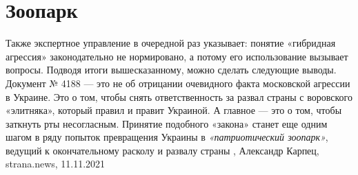  
 
 
 
 
\chapter{Зоопарк}
\label{sec:slova.zoopark}

Также экспертное управление в очередной раз указывает: понятие «гибридная
агрессия» законодательно не нормировано, а потому его использование вызывает
вопросы.  Подводя итоги вышесказанному, можно сделать следующие выводы.
Документ № 4188 — это не об отрицании очевидного факта московской агрессии в
Украине. Это о том, чтобы снять ответственность за развал страны с воровского
«элитняка», который правил и правит Украиной. А главное — это о том, чтобы
заткнуть рты несогласным. Принятие подобного «закона» станет еще одним шагом в
ряду попыток превращения Украины в \emph{«патриотический зоопарк»}, ведущий к
окончательному расколу и развалу страны
, 
Александр Карпец, strana.news, 11.11.2021

